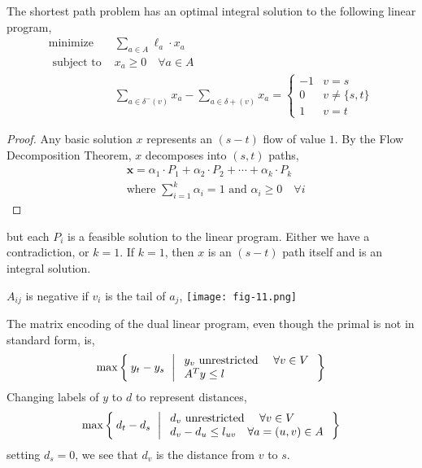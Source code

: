 	\begin{thm}
		The shortest path problem has an optimal integral solution to the following linear program,
		\[
		\begin{array}{ll}
				\operatorname{minimize} & \sum_{a \in A} \ell_{a} \cdot x_{a} \\
				\text{ subject to } & x_{a} \geq 0 \quad \forall a \in A \\
				& \sum_{a \in \delta^{-}(v)} x_{a}-\sum_{a \in \delta+(v)} x_{a}= \begin{cases}-1 & v=s \\
												0 & v \neq\{s, t\} \\
												1 & v=t\end{cases}
			\end{array}
		\]
	\end{thm}

	\begin{proof}
		Any basic solution $x$ represents an $(s-t)$ flow of value $1$. By the Flow Decomposition Theorem, $x$ decomposes into $(s,t)$ paths,
		\begin{align*}
			&\mathbf{x}=\alpha_{1} \cdot P_{1}+\alpha_{2} \cdot P_{2}+\cdots+\alpha_{k} \cdot P_{k} \\
			&\text{where } \sum_{i=1}^{k} \alpha_{i}=1 \text{ and } \alpha_{i} \geq 0 \quad \forall i
		\end{align*}
		\noindent 
	\end{proof}
	\noindent but each $P_i$ is a feasible solution to the linear program. Either we have a contradiction, or $k = 1$. If $k = 1$, then $x$ is an $(s-t)$ path itself and is an integral solution.

	\begin{marginfigure}
		$A_{ij}$ is negative if $v_i$ is the tail of $a_j$,
		\texttt{[image: fig-11.png]}
	\end{marginfigure}

	\begin{rmk}
		The matrix encoding of the dual linear program, even though the primal is not in standard form, is,
		\[\max \Set{ y_t - y_s \ | \begin{array}{l}
		    y_v \text{ unrestricted } \quad \forall v \in V  \\
		    A^Ty \leq l
		  \end{array}}\]
		\noindent Changing labels of $y$ to $d$ to represent distances,
		\[\max \Set{ d_t - d_s \ | \begin{array}{l}
		    d_v \text{ unrestricted } \quad \forall v \in V  \\
		    d_v - d_u \leq l_{uv} \quad \forall a = (u,v) \in A
		  \end{array}}\]
		\noindent setting $d_s = 0$, we see that $d_v$ is the distance from $v$ to $s$.
	\end{rmk}

